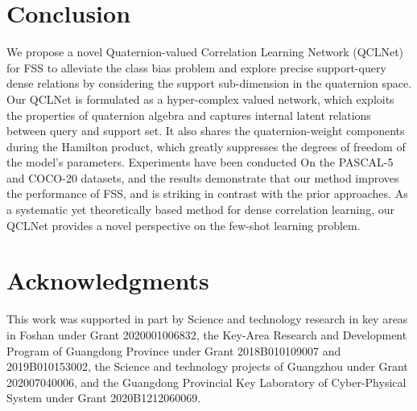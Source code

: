 \documentclass[lettersize,journal]{IEEEtran}
\begin{document}
\section{Conclusion}
We propose a novel Quaternion-valued Correlation Learning Network (QCLNet) for FSS to alleviate the class bias problem and explore precise support-query dense relations by considering the support sub-dimension in the quaternion space. Our QCLNet is formulated as a  hyper-complex valued network, which exploits the properties of quaternion algebra and captures internal latent relations between query and support set. It also shares the quaternion-weight components during the Hamilton product, which greatly suppresses the degrees of freedom of the model's parameters. Experiments have been conducted On the PASCAL-5 and COCO-20 datasets, and the results demonstrate that our method improves the performance of FSS, and is striking in contrast with the prior approaches. As a systematic yet theoretically based method for dense correlation learning, our QCLNet provides a novel perspective on the few-shot learning problem.

\section*{Acknowledgments}
This work was supported in part by Science and technology research in key areas in Foshan under Grant 2020001006832, the Key-Area Research and Development Program of Guangdong Province under Grant 2018B010109007 and 2019B010153002, the Science and technology projects of Guangzhou under Grant 202007040006, and the Guangdong Provincial Key Laboratory of Cyber-Physical System under Grant 2020B1212060069.
\end{document}
